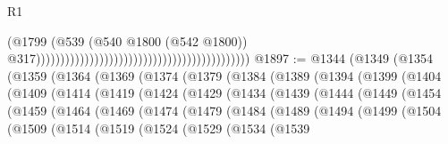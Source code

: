 \begin{lexlean}{R1}
\begin{coremodule}
{{{{{{{{{{{{{{{{{{{{{{{{{{{{{{{{{{{{{{{{                                                                                        (@1799
                                                                                          (@539
                                                                                            (@540
                                                                                              @1800
                                                                                              (@542
                                                                                                @1800))
                                                                                            @317))))))))))))))))))))))))))))))))))))))))))))
@1897 := @1344
    (@1349
      (@1354
        (@1359
          (@1364
            (@1369
              (@1374
                (@1379
                  (@1384
                    (@1389
                      (@1394
                        (@1399
                          (@1404
                            (@1409
                              (@1414
                                (@1419
                                  (@1424
                                    (@1429
                                      (@1434
                                        (@1439
                                          (@1444
                                            (@1449
                                              (@1454
                                                (@1459
                                                  (@1464
                                                    (@1469
                                                      (@1474
                                                        (@1479
                                                          (@1484
                                                            (@1489
                                                              (@1494
                                                                (@1499
                                                                  (@1504
                                                                    (@1509
                                                                      (@1514
                                                                        (@1519
                                                                          (@1524
                                                                            (@1529
                                                                              (@1534
                                                                                (@1539
}}}}}}}}}}}}}}}}}}}}}}}}}}}}}}}}}}}}}}}}
\end{coremodule}
\end{lexlean}
